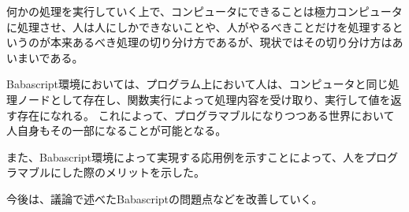 何かの処理を実行していく上で、コンピュータにできることは極力コンピュータに処理させ、人は人にしかできないことや、人がやるべきことだけを処理するというのが本来あるべき処理の切り分け方であるが、現状ではその切り分け方はあいまいである。

Babascript環境においては、プログラム上において人は、コンピュータと同じ処理ノードとして存在し、関数実行によって処理内容を受け取り、実行して値を返す存在になれる。
これによって、プログラマブルになりつつある世界において人自身もその一部になることが可能となる。

また、Babascript環境によって実現する応用例を示すことによって、人をプログラマブルにした際のメリットを示した。

今後は、議論で述べたBabascriptの問題点などを改善していく。

